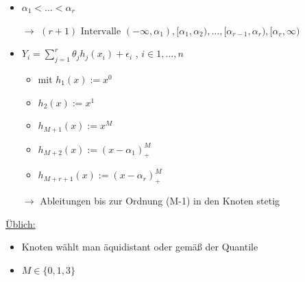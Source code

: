 \begin{itemize}
	\item $ \alpha_1 < \ldots < \alpha_r $
	\item[$\rightarrow$] $(r+1) \text{ Intervalle }  (-\infty, \alpha_1),[\alpha_1, \alpha_2) , \ldots, [\alpha_{r-1} , \alpha_r), [\alpha_r, \infty)$
	\item $Y_i  = \sum_{j=1}^{r} \theta_j h_j (x_i) + \epsilon_i$ , $i \in {1,\ldots,n}$
	\item [] 
	\begin{itemize}
		\item mit $h_1(x):=x^0$
		\item $h_2(x) := x^1$
		\item $h_{M+1}(x) := x^{M}$
		\item $h_{M+2}(x) := (x- \alpha_1)^{M}_{+}$
		\item $h_{M+r+1}(x) := (x- \alpha_r)^{M}_{+}$
	\end{itemize} 

\item[$\rightarrow$] Ableitungen bis zur Ordnung (M-1) in den Knoten stetig
\end{itemize}
\underline{Üblich:} 
\begin{itemize}
	\item Knoten wählt man äquidistant oder gemäß der Quantile
	\item $M \in \{0,1,3\}$
\end{itemize}


